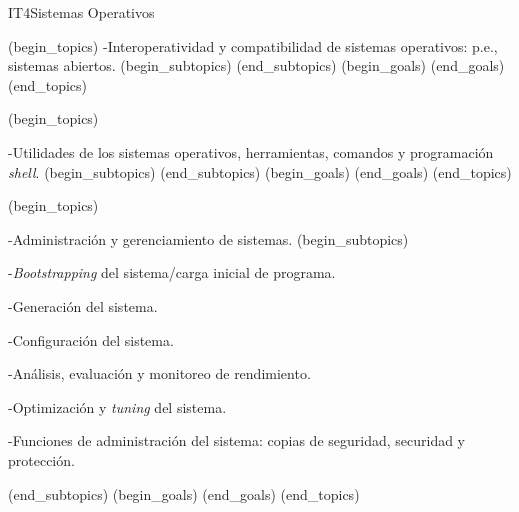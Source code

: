 \begin{BKL2}{IT4}{Sistemas Operativos}
 

(begin_topics)
-Interoperatividad y compatibilidad de sistemas operativos: p.e., sistemas abiertos.
(begin_subtopics)
(end_subtopics)
(begin_goals)
(end_goals)
(end_topics)

 

(begin_topics)

-Utilidades de los sistemas operativos, herramientas, comandos y programación \textit{shell}.
(begin_subtopics)
(end_subtopics)
(begin_goals)
(end_goals)
(end_topics)

 

(begin_topics)

-Administración y gerenciamiento de sistemas.
(begin_subtopics)

-\textit{Bootstrapping} del sistema/carga inicial de programa.

-Generación del sistema.

-Configuración del sistema.

-Análisis, evaluación y monitoreo de rendimiento.

-Optimización y \textit{tuning} del sistema.

-Funciones de administración del sistema: copias de seguridad, securidad y protección.

(end_subtopics)
(begin_goals)
(end_goals)
(end_topics)

\end{BKL2}
 


